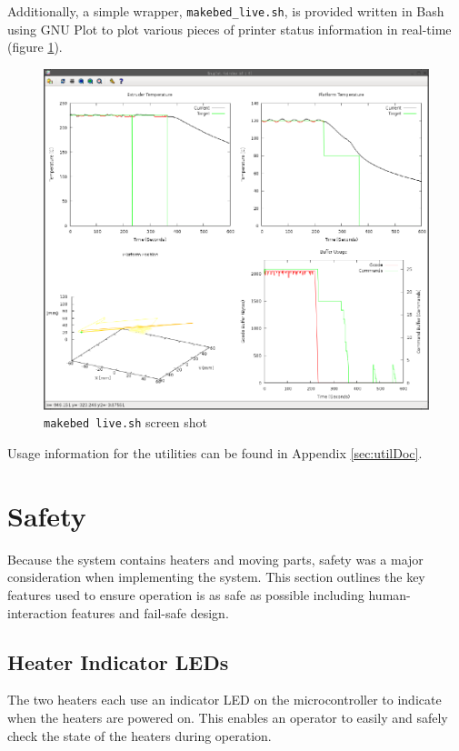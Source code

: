 		Additionally, a simple wrapper, \verb|makebed_live.sh|, is provided written
		in Bash using GNU Plot to plot various pieces of printer status information
		in real-time (figure \ref{fig:makebedlive}).
		
		\begin{figure}
			\includegraphics[width=1\textwidth]{diagrams/makebedlive.pdf}
			\caption{\texttt{makebed live.sh} screen shot}
			\label{fig:makebedlive}
		\end{figure}
		
		Usage information for the utilities can be found in Appendix
		\ref{sec:utilDoc}.
	
	\section{Safety}
		
		Because the system contains heaters and moving parts, safety was a major
		consideration when implementing the system. This section outlines the key
		features used to ensure operation is as safe as possible including
		human-interaction features and fail-safe design.
		
		\subsection{Heater Indicator LEDs}
			
			The two heaters each use an indicator LED on the microcontroller to
			indicate when the heaters are powered on. This enables an operator to
			easily and safely check the state of the heaters during operation.
		
